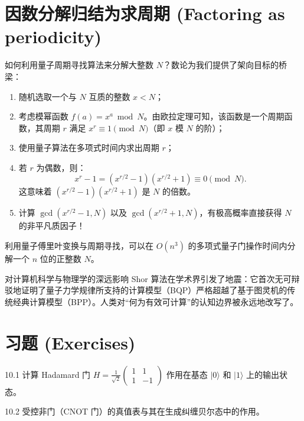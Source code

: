 \section{因数分解归结为求周期 (Factoring as periodicity)}

如何利用量子周期寻找算法来分解大整数 $N$？数论为我们提供了架向目标的桥梁：
\begin{enumerate}
    \item 随机选取一个与 $N$ 互质的整数 $x < N$；
    \item 考虑模幂函数 $f(a) = x^a \bmod N$。由欧拉定理可知，该函数是一个周期函数，其周期 $r$ 满足 $x^r \equiv 1 \pmod N$（即 $x$ 模 $N$ 的阶）；
    \item 使用量子算法在多项式时间内求出周期 $r$；
    \item 若 $r$ 为偶数，则：
    \[
    x^r - 1 = (x^{r/2} - 1)(x^{r/2} + 1) \equiv 0 \pmod N.
    \]
    这意味着 $(x^{r/2} - 1)(x^{r/2} + 1)$ 是 $N$ 的倍数。
    \item 计算 $\gcd(x^{r/2} - 1, N)$ 以及 $\gcd(x^{r/2} + 1, N)$，有极高概率直接获得 $N$ 的非平凡质因子！
\end{enumerate}

\begin{theorem}
利用量子傅里叶变换与周期寻找，可以在 $O(n^3)$ 的多项式量子门操作时间内分解一个 $n$ 位的正整数 $N$。
\end{theorem}

\begin{sidebarbox}{对计算机科学与物理学的深远影响}
Shor 算法在学术界引发了地震：它首次无可辩驳地证明了量子力学规律所支持的计算模型（BQP）严格超越了基于图灵机的传统经典计算模型（BPP）。人类对“何为有效可计算”的认知边界被永远地改写了。
\end{sidebarbox}

\newpage
\section*{习题 (Exercises)}

\begin{exercise}{10.1}
计算 Hadamard 门 $H = \frac{1}{\sqrt{2}}\begin{pmatrix} 1 & 1 \\ 1 & -1 \end{pmatrix}$ 作用在基态 $|0\rangle$ 和 $|1\rangle$ 上的输出状态。
\end{exercise}

\begin{exercise}{10.2}
受控非门（CNOT 门）的真值表与其在生成纠缠贝尔态中的作用。
\end{exercise}

